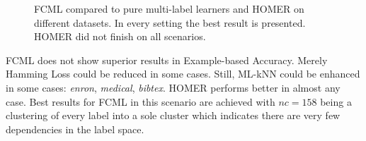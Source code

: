 			\begin{figure}
				\centering
				\caption{FCML compared to pure multi-label learners and HOMER on different datasets. In every setting the best result is presented. HOMER did not finish on all scenarios.}
				\label{fig:fcml_res}
			\end{figure}

			FCML does not show superior results in Example-based Accuracy. Merely Hamming Loss could be reduced in some cases. Still, ML-kNN could be enhanced in some cases: \textit{enron}, \textit{medical}, \textit{bibtex}. HOMER performs better in almost any case. Best results for FCML in this scenario are achieved with $nc=158$ being a clustering of every label into a sole cluster which indicates there are very few dependencies in the label space.

